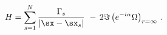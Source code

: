 \begin{equation}
  H = \sum_{s=1}^N \frac{\Gamma_s}{|\sx-\sx_s|}  \, \, - \,  2 \Im\left(e^{-i
  \alpha} \Omega\right)_{r=\infty} \,. \label{Haha}
\end{equation}

